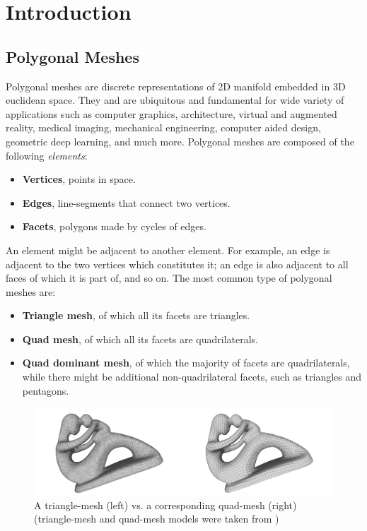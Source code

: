 \chapter{Introduction}
\section{Polygonal Meshes}
Polygonal meshes are discrete representations of 2D manifold embedded in 3D euclidean space. They and are ubiquitous and fundamental for wide variety of applications such as computer graphics, architecture, virtual and augmented reality, medical imaging, mechanical engineering, computer aided design, geometric deep learning, and much more. Polygonal meshes are composed of the following \emph{elements}:
\begin{itemize}
    \item \textbf{Vertices}, points in space.
    \item \textbf{Edges}, line-segments that connect two vertices.
    \item \textbf{Facets}, polygons made by cycles of edges.
\end{itemize}
\noindent An element might be adjacent to another element. For example, an edge is adjacent to the two vertices which constitutes it; an edge is also adjacent to all faces of which it is part of, and so on. The most common type of polygonal meshes are:
\begin{itemize}
    \item \textbf{Triangle mesh}, of which all its facets are triangles.
    \item \textbf{Quad mesh}, of which all its facets are quadrilaterals.
    \item \textbf{Quad dominant mesh}, of which the majority of facets are quadrilaterals, while there might be additional non-quadrilateral facets, such as triangles and pentagons.
\end{itemize}
\begin{figure}[ht]
\centering
\includegraphics[width=15cm]{figures/tri_mesh_vs_quad_mesh.png}
\caption[Triangular mesh vs. Quad mesh]{A triangle-mesh (left) vs. a corresponding quad-mesh (right) (triangle-mesh and quad-mesh models were taken from \cite{10.1111:cgf.13498})}
\label{fig:tri_mesh_vs_quad_mesh}
\end{figure}
